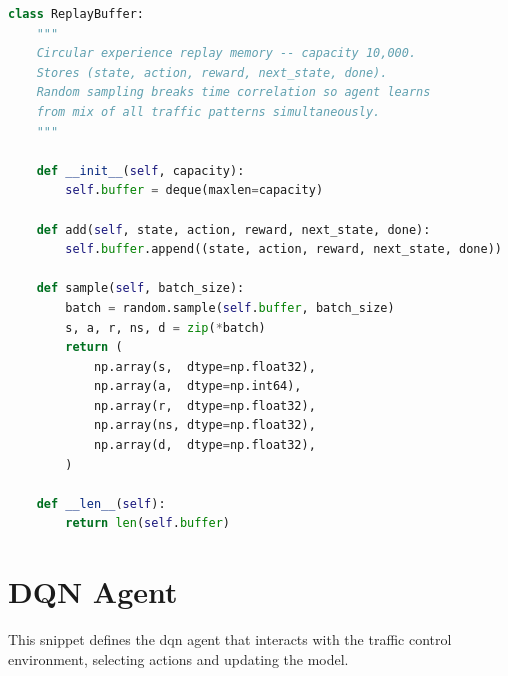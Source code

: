 \begin{lstlisting}[language=Python, caption={Replay Buffer Implementation}]
class ReplayBuffer:
    """
    Circular experience replay memory -- capacity 10,000.
    Stores (state, action, reward, next_state, done).
    Random sampling breaks time correlation so agent learns
    from mix of all traffic patterns simultaneously.
    """

    def __init__(self, capacity):
        self.buffer = deque(maxlen=capacity)

    def add(self, state, action, reward, next_state, done):
        self.buffer.append((state, action, reward, next_state, done))

    def sample(self, batch_size):
        batch = random.sample(self.buffer, batch_size)
        s, a, r, ns, d = zip(*batch)
        return (
            np.array(s,  dtype=np.float32),
            np.array(a,  dtype=np.int64),
            np.array(r,  dtype=np.float32),
            np.array(ns, dtype=np.float32),
            np.array(d,  dtype=np.float32),
        )

    def __len__(self):
        return len(self.buffer)
\end{lstlisting}

\section{DQN Agent}
\label{sec:dqn_agent_code}
This snippet defines the \gls{dqn} agent that interacts with the traffic control environment, selecting actions and updating the model.

